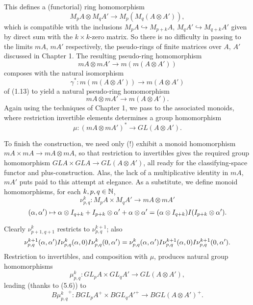 This defines a (functorial) ring homomorphism
\[M_pA \otimes M_qA' \longrightarrow M_p(M_q(A \otimes A')),\]
which is compatible with the inclusions $M_pA \hookrightarrow M_{p+k}A$, $M_qA' \hookrightarrow M_{q+k}A'$ given by direct sum with the $k\times k$-zero matrix. So there is no difficulty in passing to the limits $mA$, $mA'$ respectively, the pseudo-rings of finite matrices over $A$, $A'$ discussed in Chapter 1. The resulting pseudo-ring homomorphism
\[mA \otimes mA' \longrightarrow m(m(A \otimes A'))\]
 composes with the natural isomorphism
 \[\gamma^* \colon  m(m(A \otimes A')) \longrightarrow m(A \otimes A')\]
of (1.13) to yield a natural pseudo-ring homomorphism 
\[mA \otimes mA'\longrightarrow m(A \otimes A').\]
Again using the techniques of Chapter 1, we pass to the associated monoids, where restriction invertible elements determines a group homomorphism
\[\mu \colon  (mA \otimes mA')^* \longrightarrow GL(A \otimes A').\]

To finish the construction, we need only (!) exhibit a monoid homomorphism
$mA \times mA \longrightarrow mA \otimes mA$, so that restriction to invertibles gives the required group homomorphism
$GLA \times GLA \longrightarrow GL(A \otimes A')$, all ready for the classifying-space functor and plus-construction.
Alas, the lack of a multiplicative identity in $mA$, $mA'$ puts paid to this attempt at elegance. As a substitute, we define monoid homomorphisms, for each $k, p, q \in \mathbb{N}$,
\[\nu_{p,q}^k\colon M_pA \times M_qA' \longrightarrow mA \otimes mA'\]
\[(\alpha, \alpha') \mapsto \alpha \otimes I_{q+k} + I_{p+k} \otimes  \alpha' +  \alpha \otimes  \alpha'
= ( \alpha \otimes I_{q+k}) \ding{73}(I_{p+k}\otimes \alpha').\]

Clearly $\nu_{p+1,q+1}^k$ restricts to $\nu_{p,q}^{k+1}$; also
\[\nu_{p,q}^{k+1} (\alpha, \alpha') \ding{73} \nu_{p,q}^k(\alpha,0) \ding{73} \nu_{p,q}^k (0,\alpha') = \nu_{p,q}^k(\alpha,\alpha') \ding{73} \nu_{p,q}^{k+1}(\alpha,0) \ding{73} \nu_{p,q}^{k+1} (0,\alpha').\]
Restriction to invertibles, and composition with $\mu$, produces natural group homomorphisms 
\[\mu_{p,q}^k \colon  GL_pA \times GL_qA' \longrightarrow GL(A \otimes A'),\]
leading (thanks to (5.6)) to
\[{B\mu_{p,q}^k}^+ \colon  {BGL_pA}^+ \times {BGL_qA'}^+ \longrightarrow {BGL(A \otimes A')}^+.\]

